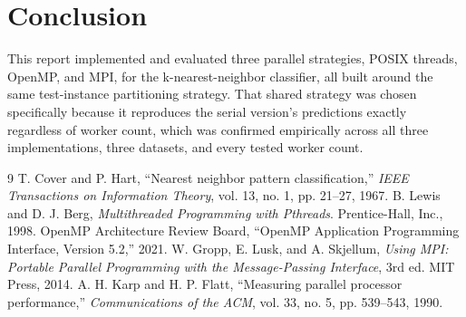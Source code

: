 \documentclass[conference]{IEEEtran}
\begin{document}

\section{Conclusion}
\label{sec:conclusion}

This report implemented and evaluated three parallel strategies, POSIX
threads, OpenMP, and MPI, for the k-nearest-neighbor classifier, all built
around the same test-instance partitioning strategy. That shared strategy
was chosen specifically because it reproduces the serial version's
predictions exactly regardless of worker count, which was confirmed
empirically across all three implementations, three datasets, and every
tested worker count.

\begin{thebibliography}{9}
 T. Cover and P. Hart, ``Nearest neighbor pattern classification,'' \emph{IEEE Transactions on Information Theory}, vol. 13, no. 1, pp. 21--27, 1967.
 B. Lewis and D. J. Berg, \emph{Multithreaded Programming with Pthreads}. Prentice-Hall, Inc., 1998.
 OpenMP Architecture Review Board, ``OpenMP Application Programming Interface, Version 5.2,'' 2021.
 W. Gropp, E. Lusk, and A. Skjellum, \emph{Using MPI: Portable Parallel Programming with the Message-Passing Interface}, 3rd ed. MIT Press, 2014.
 A. H. Karp and H. P. Flatt, ``Measuring parallel processor performance,'' \emph{Communications of the ACM}, vol. 33, no. 5, pp. 539--543, 1990.
\end{thebibliography}
\end{document}
